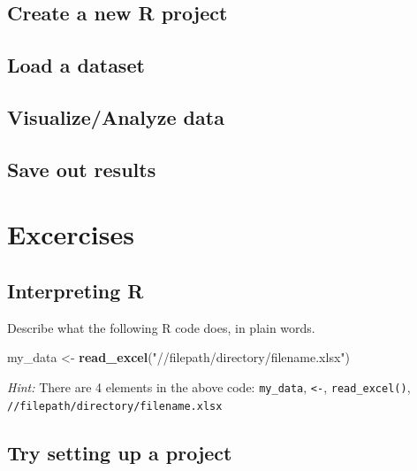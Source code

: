 \documentclass[
]{book}
\newenvironment{Shaded}{\begin{snugshade}}{\end{snugshade}}
\newcommand{\FunctionTok}[1]{\textcolor[rgb]{0.13,0.29,0.53}{\textbf{#1}}}
\newcommand{\NormalTok}[1]{#1}
\newcommand{\OtherTok}[1]{\textcolor[rgb]{0.56,0.35,0.01}{#1}}
\newcommand{\StringTok}[1]{\textcolor[rgb]{0.31,0.60,0.02}{#1}}
\begin{document}
\hypertarget{create-a-new-r-project}{%
\subsection{Create a new R project}\label{create-a-new-r-project}}

\hypertarget{load-a-dataset}{%
\subsection{Load a dataset}\label{load-a-dataset}}

\hypertarget{visualizeanalyze-data}{%
\subsection{Visualize/Analyze data}\label{visualizeanalyze-data}}

\hypertarget{save-out-results}{%
\subsection{Save out results}\label{save-out-results}}

\hypertarget{excercises}{%
\section*{Excercises}\label{excercises}}

\hypertarget{interpreting-r}{%
\subsection{Interpreting R}\label{interpreting-r}}

Describe what the following R code does, in plain words.

\begin{Shaded}
\begin{Highlighting}[]
\NormalTok{my\_data }\OtherTok{\textless{}{-}} \FunctionTok{read\_excel}\NormalTok{(}\StringTok{"//filepath/directory/filename.xlsx"}\NormalTok{)}
\end{Highlighting}
\end{Shaded}

\emph{Hint:} There are 4 elements in the above code:
\texttt{my\_data},
\texttt{\textless{}-},
\texttt{read\_excel()},
\texttt{//filepath/directory/filename.xlsx}

\hypertarget{try-setting-up-a-project}{%
\subsection{Try setting up a project}\label{try-setting-up-a-project}}
\end{document}
